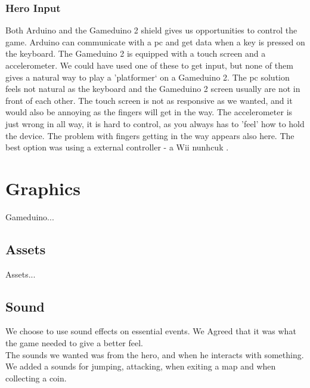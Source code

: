 \subsubsection{Hero Input}
Both Arduino and the Gameduino 2 shield gives us opportunities to control the game.
Arduino can communicate with a pc and get data when a key is pressed on the keyboard.
The Gameduino 2 is equipped with a touch screen and a accelerometer. We could have used
one of these to get input, but none of them
gives a natural way to play a 'platformer` on a Gameduino 2. The pc solution
feels not natural as the keyboard and the Gameduino 2 screen usually are not in front of each other. The touch screen is not as responsive as we wanted, and it would also be annoying
as the fingers will get in the way. The accelerometer is just wrong in all way, it is hard
to control, as you always has to 'feel' how to hold the device. The problem with fingers
getting in the way appears also here. The best option was using a external controller - a Wii nunhcuk
.




\section{Graphics}
Gameduino...

\subsection{Assets}
Assets...

\subsection{Sound} %
We choose to use sound effects on essential events.
We Agreed that it was what the game needed to give a better feel.\\
The sounds we wanted was from the hero, and when he interacts with something.
We added a sounds for jumping, attacking, when exiting a map and when collecting a coin.\\

